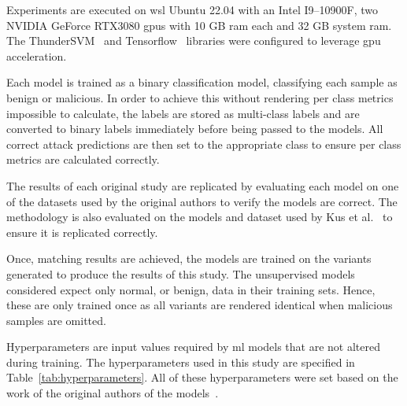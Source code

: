 Experiments are executed on \gls{wsl} Ubuntu 22.04 with an Intel I9--10900F,
two NVIDIA GeForce RTX3080 \gls{gpu}s with 10 GB \gls{ram} each and 32 GB
system \gls{ram}. The ThunderSVM~\cite{ThunderSVM} and
Tensorflow~\cite{tensorflow} libraries were configured to leverage \gls{gpu}
acceleration.

Each model is trained as a binary classification model, classifying each sample
as benign or malicious. In order to achieve this without rendering per class
metrics impossible to calculate, the labels are stored as multi-class labels
and are converted to binary labels immediately before being passed to the
models. All correct attack predictions are then set to the appropriate class to
ensure per class metrics are calculated correctly.

The results of each original study are replicated by evaluating each model on
one of the datasets used by the original authors to verify the models are
correct. The methodology is also evaluated on the models and dataset
used by Kus et al.~\cite{Kus} to ensure it is replicated correctly.

Once, matching results are achieved, the models are trained on the variants
generated to produce the results of this study. The unsupervised models
considered expect only normal, or benign, data in their training sets. Hence,
these are only trained once as all variants are rendered identical when
malicious samples are omitted.

Hyperparameters are input values required by \gls{ml} models that are not
altered during training. The hyperparameters used in this study are specified
in Table~\ref{tab:hyperparameters}. All of these hyperparameters were set based
on the work of the original authors of the models~\cite{Karatas, Pu, Cao}.

